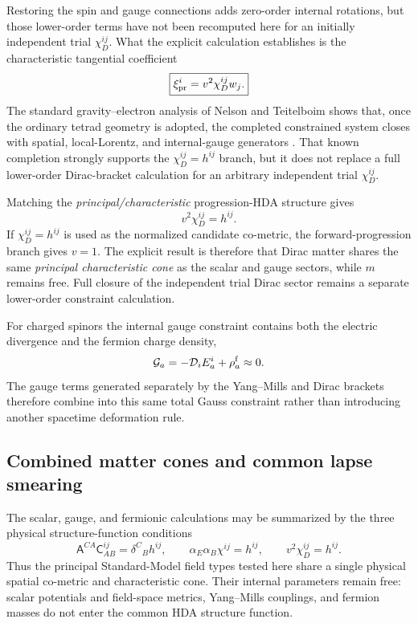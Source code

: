 \documentclass[11pt]{article}
\begin{document}
Restoring the spin and gauge connections adds zero-order internal rotations, but those lower-order terms have not been recomputed here for an initially independent trial $\chi_D^{ij}$. What the explicit calculation establishes is the characteristic tangential coefficient
\begin{equation}
    \boxed{\xi^i_{\rm pr}=v^2\chi_D^{ij}w_j.}
    \label{eq:Dirac_structure_function}
\end{equation}
The standard gravity--electron analysis of Nelson and Teitelboim shows that, once the ordinary tetrad geometry is adopted, the completed constrained system closes with spatial, local-Lorentz, and internal-gauge generators \cite{NelsonTeitelboim1978}. That known completion strongly supports the $\chi_D^{ij}=h^{ij}$ branch, but it does not replace a full lower-order Dirac-bracket calculation for an arbitrary independent trial $\chi_D^{ij}$.

Matching the \emph{principal/characteristic} progression-HDA structure gives
\begin{equation}
\boxed{
    v^2\chi_D^{ij}=h^{ij}.}
\label{eq:Dirac_closure_condition}
\end{equation}
If $\chi_D^{ij}=h^{ij}$ is used as the normalized candidate co-metric, the forward-progression branch gives $v=1$. The explicit result is therefore that Dirac matter shares the same \emph{principal characteristic cone} as the scalar and gauge sectors, while $m$ remains free. Full closure of the independent trial Dirac sector remains a separate lower-order constraint calculation.

For charged spinors the internal gauge constraint contains both the electric divergence and the fermion charge density,
\begin{equation}
    \mathcal G_a
    =-\mathcal D_iE_a^i+\rho_a^{\rm f}\approx0.
\end{equation}
The gauge terms generated separately by the Yang--Mills and Dirac brackets therefore combine into this same total Gauss constraint rather than introducing another spacetime deformation rule.

\subsection{Combined matter cones and common lapse smearing}
\label{subsec:combined_matter_closure}

The scalar, gauge, and fermionic calculations may be summarized by the three physical structure-function conditions
\begin{equation}
\boxed{
\mathsf A^{CA}\mathsf C^{ij}_{AB}=\delta^C{}_Bh^{ij},
\qquad
\alpha_E\alpha_B\chi^{ij}=h^{ij},
\qquad
v^2\chi_D^{ij}=h^{ij}.}
\label{eq:three_matter_closures}
\end{equation}
Thus the principal Standard-Model field types tested here share a single physical spatial co-metric and characteristic cone. Their internal parameters remain free: scalar potentials and field-space metrics, Yang--Mills couplings, and fermion masses do not enter the common HDA structure function.
\end{document}
